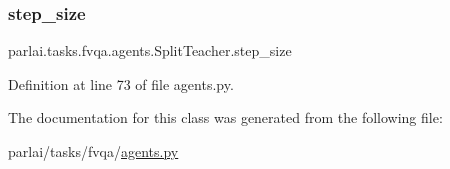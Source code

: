 \subsubsection{\texorpdfstring{step\+\_\+size}{step\_size}}
{\footnotesize\ttfamily parlai.\+tasks.\+fvqa.\+agents.\+Split\+Teacher.\+step\+\_\+size}



Definition at line 73 of file agents.\+py.



The documentation for this class was generated from the following file\+:\begin{DoxyCompactItemize}
\item 
parlai/tasks/fvqa/\hyperlink{parlai_2tasks_2fvqa_2agents_8py}{agents.\+py}\end{DoxyCompactItemize}
